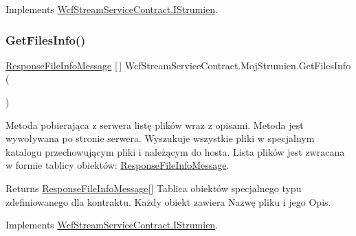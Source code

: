 Implements \hyperlink{interface_wcf_stream_service_contract_1_1_i_strumien_a4a6bde2f298213a20537461a4a2bf384}{Wcf\+Stream\+Service\+Contract.\+I\+Strumien}.

\mbox{\label{class_wcf_stream_service_contract_1_1_moj_strumien_a48ae5c4785e9603cfcf2aa75e2ecd189}} 
\subsubsection{\texorpdfstring{Get\+Files\+Info()}{GetFilesInfo()}}
{\footnotesize\ttfamily \hyperlink{class_wcf_stream_service_contract_1_1_response_file_info_message}{Response\+File\+Info\+Message} \mbox{[}$\,$\mbox{]} Wcf\+Stream\+Service\+Contract.\+Moj\+Strumien.\+Get\+Files\+Info (\begin{DoxyParamCaption}{ }\end{DoxyParamCaption})\hspace{0.3cm}{\ttfamily [inline]}}



Metoda pobierająca z serwera listę plików wraz z opisami. Metoda jest wywoływana po stronie serwera. Wyszukuje wszystkie pliki w specjalnym katalogu przechowującym pliki i należącym do hosta. Lista plików jest zwracana w formie tablicy obiektów\+: \hyperlink{class_wcf_stream_service_contract_1_1_response_file_info_message}{Response\+File\+Info\+Message}. 

\begin{DoxyReturn}{Returns}
\hyperlink{class_wcf_stream_service_contract_1_1_response_file_info_message}{Response\+File\+Info\+Message}\mbox{[}\mbox{]} Tablica obiektów specjalnego typu zdefiniowanego dla kontraktu. Każdy obiekt zawiera Nazwę pliku i jego Opis.
\end{DoxyReturn}


Implements \hyperlink{interface_wcf_stream_service_contract_1_1_i_strumien_ae0e59eb415597d2af101adaa7e33032d}{Wcf\+Stream\+Service\+Contract.\+I\+Strumien}.

\mbox{\label{class_wcf_stream_service_contract_1_1_moj_strumien_aa6fbe99058d30cab2dc035310c441664}} 
